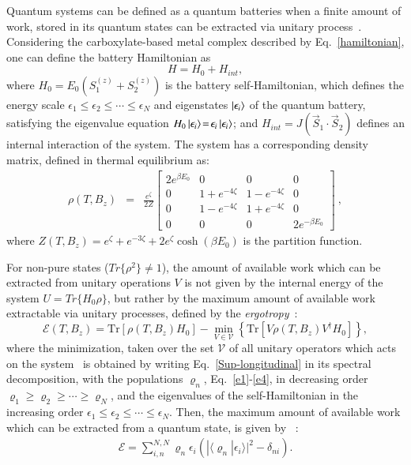 \documentclass[aps,prl,epsfigure,twocolumn,superscriptaddress]{revtex4-1}
\newcommand{\Ecal}{\mathcal{E}}
\newcommand{\Vcal}{\mathcal{V}}
\newcommand{\1}{\mathbbm{1}}
\newcommand{\interpro}[2]{\langle #1 | #2 \rangle}
\begin{document}
Quantum systems can be defined as a quantum batteries when a finite amount of work, stored in its quantum states can be extracted via unitary process~\cite{Liu:19,Alicki:13,PhysRevE.102.042111}. Considering the carboxylate-based metal complex described by Eq.~\eqref{hamiltonian}, one can define the battery Hamiltonian as 
\begin{equation}
H = H_{0}+ H_{int},
\label{batery_hamiltonian}
\end{equation}
where $H_{0}= E_{0} \left(S_{1}^{(z)}+S_{2}^{(z)}\right)$ is the battery self-Hamiltonian, which defines the energy scale $\epsilon_{1}\!\leq\!\epsilon_{2}\!\leq\!\cdots\!\leq\!\epsilon_{N}$ and eigenstates $\ket{\epsilon_{i}}$ of the quantum battery, satisfying the eigenvalue equation $H_{0}\ket{\epsilon_{i}}\!=\!\epsilon_{i}\ket{\epsilon_{i}}$; and $H_{int}=J \left( \vec{S}_{1} \cdot \vec{S}_{2} \right)$ defines an internal interaction of the system. The system has a corresponding density matrix, defined in thermal equilibrium as:
\begin{align}
\rho(T,B_z) &=&\frac{e^{{\zeta}}}{2Z}\left[
\begin{matrix} 2e^{\beta E_{0}} & 0 & 0 & 0 \\
0& {1 +  e^{-4{\zeta}}} & {1 -  e^{-4{\zeta}}}  & 0\\
0& {1 -  e^{-4{\zeta}}}  & {1 +  e^{-4{\zeta}}}  & 0\\
0& 0& 0 & 2e^{-\beta E_{0}} 
\end{matrix} \right]~,
\label{Sup-longitudinal}
\end{align}
where $Z(T,B_z)\!=\!e^{{\zeta}} + e^{-3{\zeta}} + 2 e^{{\zeta}} \cosh\left(\beta E_{0}\right)$ is the partition function. 

For non-pure states ($Tr\{\rho^2\}\!\neq\!1$), the amount of available work which can be extracted from unitary operations $V$ is not given by the internal energy of the system $U\!=\!Tr\{H_{0}\rho\}$, but rather by the maximum amount of available work extractable via unitary processes, defined by the \textit{ergotropy}~\cite{Allahverdyan:04,Liu:19,Alicki:13,PhysRevE.102.042111}:
\begin{equation}
\Ecal(T,B_z)\!=\!\mbox{Tr}\left[\rho(T,B_z) H_{0}\right] - \min_{V\in \Vcal}\left\{\mbox{Tr}\left[V\rho(T,B_z) V^\dagger H_{0}\right]\right\},
\label{Sup-Ergotropy}
\end{equation}
where the minimization, taken over the set $\Vcal$ of all unitary operators which acts on the system~\cite{Allahverdyan:04} is obtained by writing Eq.~\eqref{Sup-longitudinal} in its spectral decomposition, with the populations $\varrho_{n}$, Eq.~\eqref{e1}-\eqref{e4}, in decreasing order $\varrho_{1}\!\geq\!\varrho_{2}\!\geq\!\cdots\!\geq\!\varrho_{N}$, and the eigenvalues of the self-Hamiltonian in the increasing order $\epsilon_{1}\!\leq\!\epsilon_{2}\!\leq\!\cdots\!\leq\!\epsilon_{N}$. Then, the maximum amount of available work which can be extracted from a quantum state, is given by  ~\cite{Allahverdyan:04,Gianluca:17,Alicki:13}:
\begin{align}
\Ecal = \sum\nolimits_{i,n}^{N,N} \varrho_{n} \epsilon_{i} \left( |\interpro{\varrho_{n}}{\epsilon_{i}}|^2 - \delta_{ni} \right). \label{Sup-ErgotropyXstates}
\end{align}
\end{document}
